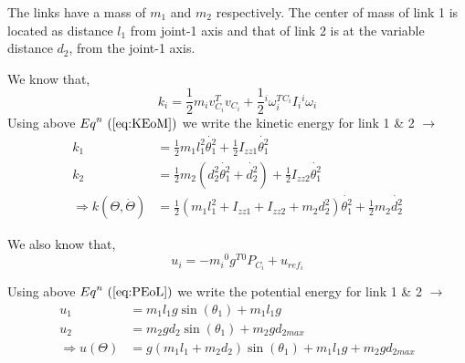 \documentclass[a4paper]{article}
\begin{document}
\begin{qalist}
			The links have a mass of ${m}_{1}$ and ${m}_{2}$ respectively. The center of mass of link 1 is located as distance ${l}_{1}$ from joint-1 axis and that of link 2 is at the variable distance ${d}_{2}$, from the joint-1 axis.
			
			We know that, 
			\begin{equation} \label{eq:KEoM}
				{k}_{i} = \frac{1}{2} {m}_{i} {v}^{T}_{{C}_{i}} {v}_{{C}_{i}} + \frac{1}{2} {}^{i} {\omega}^{T}_{i} {}^{{C}_{i}}{I}_{i} {}^{i}{\omega}_{i}
			\end{equation}
			Using above ${Eq}^{n}~(\ref{eq:KEoM})$ we write the kinetic energy for link 1 \& 2 $\rightarrow$
			\begin{align}
				\label{eq:KEoL1}{k}_{1} &= \frac{1}{2} {m}_{1} {l}^{2}_{1} \dot{{\theta}^{2}_{1}} + \frac{1}{2}  {I}_{zz1} \dot{{\theta}^{2}_{1}} \\
				\label{eq:KEoL2}{k}_{2} &= \frac{1}{2} {m}_{2} ({d}^{2}_{2} \dot{{\theta}^{2}_{1}} + \dot{{d}^{2}_{2}}) + \frac{1}{2}  {I}_{zz2} \dot{{\theta}^{2}_{1}} \\ 
				\label{eq:KETot} \Rightarrow k(\Theta, \dot{\Theta}) &= \frac{1}{2} ({m}_{1}{l}^{2}_{1} + {I}_{zz1} + {I}_{zz2} + {m}_{2} {d}^{2}_{2}) \dot{{\theta}^{2}_{1}} + \frac{1}{2} {m}_{2} \dot{{d}^{2}_{2}}
			\end{align}
			
			We also know that, 
			\begin{equation}\label{eq:PEoL}
				{u}_{i} = -{m}_{i} {}^{0}{g}^{T} {}^{0}{P}_{{C}_{i}} + {u}_{{ref}_{i}}
			\end{equation}
			
			Using above  ${Eq}^{n}~(\ref{eq:PEoL})$ we write the potential energy for link 1 \& 2 $\rightarrow$
			\begin{align}
				\label{eq:PEoL1} {u}_{1} &= {m}_{1} {l}_{1} g \sin({\theta}_{1}) + {m}_{1} {l}_{1} g \\
				\label{eq:PEoL2} {u}_{2} &= {m}_{2} g {d}_{2} \sin({\theta}_{1}) + {m}_{2} g {d}_{2max} \\
				\label{eq:PETot} \Rightarrow  u(\Theta) &= g ({m}_{1} {l}_{1} + {m}_{2} {d}_{2} ) \sin({\theta}_{1}) + {m}_{1} {l}_{1} g + {m}_{2} g {d}_{2max}
			\end{align}
			

\end{qalist}
\end{document}

